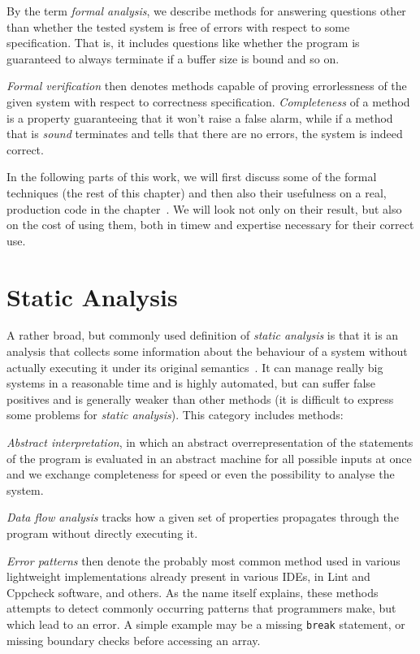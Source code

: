 By the term {\em formal analysis}, we describe methods for answering questions other than whether the tested system is free of errors with respect to some specification. That is, it includes questions like whether the program is guaranteed to always terminate if a buffer size is bound and so on.

{\em Formal verification} then denotes methods capable of proving errorlessness of the given system with respect to correctness specification. {\em Completeness} of a method is a property guaranteeing that it won't raise a false alarm, while if a method that is {\em sound} terminates and tells that there are no errors, the system is indeed correct.

In the following parts of this work, we will first discuss some of the formal techniques (the rest of this chapter) and then also their usefulness on a real, production code in the chapter~. We will look not only on their result, but also on the cost of using them, both in timew and expertise necessary for their correct use.

\section{Static Analysis}\label{chap:fav:staticAnalysis}
A rather broad, but commonly used definition of {\em static analysis} is that it is an analysis that collects some information about the behaviour of a system without actually executing it under its original semantics~\cite[Chap. 2.2]{KrenaVojnarOverview}. It can manage really big systems in a reasonable time and is highly automated, but can suffer false positives and is generally weaker than other methods (it is difficult to express some problems for {\em static analysis}). This category includes methods:

{\em Abstract interpretation}, in which an abstract overrepresentation of the statements of the program is evaluated in an abstract machine for all possible inputs at once and we exchange completeness for speed or even the possibility to analyse the system.

{\em Data flow analysis} tracks how a given set of properties propagates through the program without directly executing it.

{\em Error patterns} then denote the probably most common method used in various lightweight implementations already present in various IDEs, in Lint and Cppcheck software, and others. As the name itself explains, these methods attempts to detect commonly occurring patterns that programmers make, but which lead to an error. A simple example may be a missing {\tt break} statement, or missing boundary checks before accessing an array.

